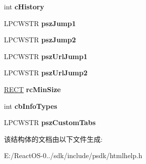\begin{DoxyCompactItemize}
int {\bfseries c\+History}
\item 
\mbox{\label{structtag_h_h___w_i_n_t_y_p_e_w_a14dce7d53883c87db375893d51de3d6d}} 
L\+P\+C\+W\+S\+TR {\bfseries psz\+Jump1}
\item 
\mbox{\label{structtag_h_h___w_i_n_t_y_p_e_w_a8626a45691f990b0475fbb23218e3dbb}} 
L\+P\+C\+W\+S\+TR {\bfseries psz\+Jump2}
\item 
\mbox{\label{structtag_h_h___w_i_n_t_y_p_e_w_adb7b096c50162b504092025b6fc49a49}} 
L\+P\+C\+W\+S\+TR {\bfseries psz\+Url\+Jump1}
\item 
\mbox{\label{structtag_h_h___w_i_n_t_y_p_e_w_aa7e510105aac14f88c5118950323777d}} 
L\+P\+C\+W\+S\+TR {\bfseries psz\+Url\+Jump2}
\item 
\mbox{\label{structtag_h_h___w_i_n_t_y_p_e_w_aeceb43896bf3d4db7fcac9946800db59}} 
\hyperlink{structtag_r_e_c_t}{R\+E\+CT} {\bfseries rc\+Min\+Size}
\item 
\mbox{\label{structtag_h_h___w_i_n_t_y_p_e_w_ad62d44bb8c6ba435b8b47648056dc64b}} 
int {\bfseries cb\+Info\+Types}
\item 
\mbox{\label{structtag_h_h___w_i_n_t_y_p_e_w_aef6fb0d1f2f76969282e467f5d12cfe7}} 
L\+P\+C\+W\+S\+TR {\bfseries psz\+Custom\+Tabs}
\end{DoxyCompactItemize}


该结构体的文档由以下文件生成\+:\begin{DoxyCompactItemize}
\item 
E\+:/\+React\+O\+S-\/0../sdk/include/psdk/htmlhelp.\+h\end{DoxyCompactItemize}
